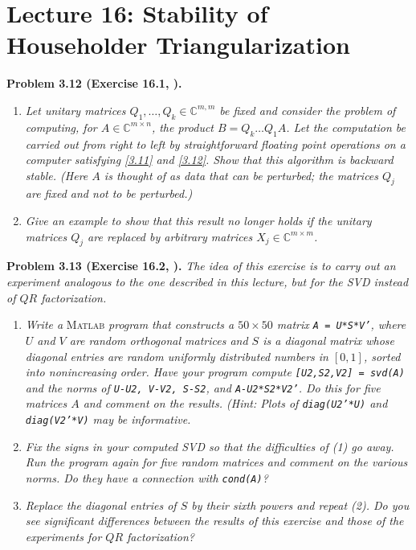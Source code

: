 \documentclass[a4paper,oneside]{book}
\numberwithin{equation}{chapter}
\begin{document}
\section{Lecture 16: Stability of Householder Triangularization}
\textbf{Problem 3.12 (Exercise 16.1, \cite{1}).}
\begin{enumerate}
\item \textit{Let unitary matrices $Q_1,\ldots,Q_k \in \mathbb{C}^{m,m}$ be fixed and consider the problem of computing, for $A\in \mathbb{C}^{m\times n}$, the product $B=Q_k \ldots Q_1 A$. Let the computation be carried out from right to left by straightforward floating point operations on a computer satisfying \eqref{3.11} and \eqref{3.12}. Show that this algorithm is backward stable. (Here $A$ is thought of as data that can be perturbed; the matrices $Q_j$ are fixed and not to be perturbed.)}
\item \textit{Give an example to show that this result no longer holds if the unitary matrices $Q_j$ are replaced by arbitrary matrices $X_j \in \mathbb{C}^{m\times m}$.}
\end{enumerate}
\textbf{Problem 3.13 (Exercise 16.2, \cite{1}).} \textit{The idea of this exercise is to carry out an experiment analogous to the one described in this lecture, but for the SVD instead of $QR$ factorization.}
\begin{enumerate}
\item \textit{Write a}\textsc{ Matlab}\textit{ program that constructs a $50\times 50$ matrix \texttt{A = U*S*V'}, where $U$ and $V$ are random orthogonal matrices and $S$ is a diagonal matrix whose diagonal entries are random uniformly distributed numbers in $\left[0,1\right]$, sorted into nonincreasing order. Have your program compute \texttt{[U2,S2,V2] = svd(A)} and the norms of \texttt{U-U2, V-V2, S-S2}, and \texttt{A-U2*S2*V2'}. Do this for five matrices $A$ and comment on the results. (Hint: Plots of \texttt{diag(U2'*U)} and \texttt{diag(V2'*V)} may be informative.}
\item \textit{Fix the signs in your computed SVD so that the difficulties of (1) go away. Run the program again for five random matrices and comment on the various norms. Do they have a connection with \texttt{cond(A)}?}
\item \textit{Replace the diagonal entries of $S$ by their sixth powers and repeat (2). Do you see significant differences between the results of this exercise and those of the experiments for $QR$ factorization?}
\end{enumerate}
\end{document}
